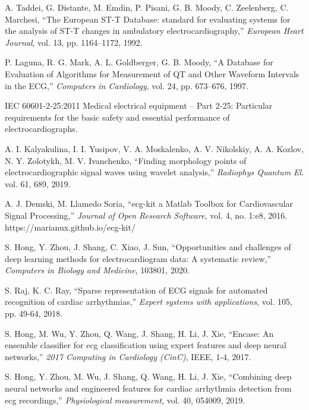 \documentclass[submitted]{ieeeaccess}
\newcommand{\NewCorrection}[1]{{#1}}
\begin{document}
\begin{thebibliography}{99}
	A. Taddei, G. Distante, M. Emdin, P. Pisani, G. B. Moody, C. Zeelenberg, C. Marchesi, 
	``{T}he European ST-T Database: standard for evaluating systems for the analysis of ST-T changes in ambulatory electrocardiography,'' 
	\emph{European Heart Journal}, vol. 13, pp. 1164--1172, 1992.
	
	P. Laguna, R. G. Mark, A. L. Goldberger, G. B. Moody, 
	``{A} Database for Evaluation of Algorithms for Measurement of QT and Other Waveform Intervals in the ECG,''
	\emph{Computers in Cardiology}, vol. 24, pp. 673--676, 1997.
	
	 IEC 60601-2-25:2011 
    Medical electrical equipment -- Part 2-25: Particular requirements for the basic safety and essential performance of electrocardiographs.

    A. I. Kalyakulina, I. I. Yusipov, V. A. Moskalenko, A. V. Nikolskiy, A. A. Kozlov, N. Y. Zolotykh, M. V. Ivanchenko, 
    ``Finding morphology points of electrocardiographic signal waves using wavelet analysis,''
    \emph{Radiophys Quantum El}.
    vol. 61, 689, 2019.

    A. J. Demski, M. Llamedo Soria, 
    ``ecg-kit a Matlab Toolbox for Cardiovascular Signal Processing,'' 
    \emph{Journal of Open Research Software}, vol. 4, no. 1:e8, 2016. https://marianux.github.io/ecg-kit/

	
	\NewCorrection{S. Hong, Y. Zhou, J. Shang, C. Xiao, J. Sun, ``Opportunities and challenges of deep learning methods for electrocardiogram data: A systematic review,'' \emph{Computers in Biology and Medicine}, 103801, 2020.}
	
	\NewCorrection{S. Raj, K. C. Ray, ``Sparse representation of ECG signals for automated recognition of cardiac arrhythmias,'' \emph{Expert systems with applications}, vol. 105, pp. 49-64, 2018.}

	\NewCorrection{S. Hong, M. Wu, Y. Zhou, Q.  Wang, J. Shang, H. Li, J. Xie, 
	``Encase: An ensemble classifier for ecg classification using
	expert features and deep neural networks,'' \emph{2017 Computing in
	Cardiology (CinC)}, IEEE, 1-4, 2017.}
	
	\NewCorrection{S. Hong, Y. Zhou, M. Wu, J. Shang, Q. Wang, H. Li, J. Xie, 
	``Combining deep neural networks and engineered features
	for cardiac arrhythmia detection from ecg recordings,'' \emph{Physiological
	measurement}, vol. 40, 054009, 2019.}
	

\end{thebibliography}
\end{document}
